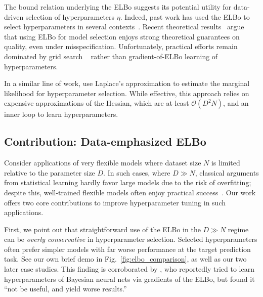 The bound relation underlying the ELBo suggests its potential utility for data-driven selection of hyperparameters $\eta$. 
Indeed, past work has used the ELBo to select hyperparameters in several contexts~\citep{uedaBayesianModelSearch2002,damianouDeepGaussianProcesses2013}.
Recent theoretical results~\citep{cherief2019consistency} argue that using ELBo for model selection enjoys strong theoretical guarantees on quality, even under misspecification.
Unfortunately, practical efforts remain dominated by grid search ~\citep{osawa2019practical,shwartz2022pre} rather than gradient-of-ELBo learning of hyperparameters.

In a similar line of work, \citet{immer2021scalable} use Laplace's approximation to estimate the marginal likelihood for hyperparameter selection.
While effective, this approach relies on expensive approximations of the Hessian, which are at least $\mathcal{O}(D^2N)$, and an inner loop to learn hyperparameters.

\subsection{Contribution: Data-emphasized ELBo}

Consider applications of very flexible models where dataset size $N$ is limited relative to the parameter size $D$.
In such cases, where $D \gg N$, classical arguments from statistical learning hardly favor large models due to the risk of overfitting; despite this, well-trained flexible models often enjoy practical success~\citep{sharif2014cnn,xuhong2018explicit}.
Our work offers two core contributions to improve hyperparameter tuning in such applications. 

First, we point out that straightforward use of the ELBo in the $D \gg N$ regime can be \emph{overly conservative} in hyperparameter selection. Selected hyperparameters often prefer simpler models with far worse performance at the target prediction task. 
See our own brief demo in Fig.~\ref{fig:elbo_comparison}, as well as our two later case studies.
This finding is corroborated by \citet{blundell2015weight}, who reportedly tried to learn hyperparameters of Bayesian neural nets via gradients of the ELBo, but found it ``not be useful, and yield worse results.''

